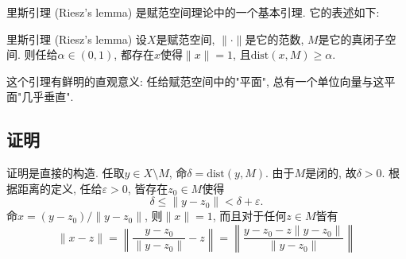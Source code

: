 
里斯引理 (Riesz's lemma) 是赋范空间理论中的一个基本引理. 它的表述如下:

\begin{lemma}{里斯引理 (Riesz's lemma)}
设$X$是赋范空间, $\|\cdot\|$是它的范数, $M$是它的真闭子空间. 则任给$\alpha\in(0,1)$, 都存在$x$使得$\|x\|=1$, 且$\text{dist}(x,M)\geq\alpha$.
\end{lemma}

这个引理有鲜明的直观意义: 任给赋范空间中的"平面", 总有一个单位向量与这平面"几乎垂直".

\subsection{证明}
证明是直接的构造. 任取$y\in X\setminus M$, 命$\delta=\text{dist}(y,M)$. 由于$M$是闭的, 故$\delta>0$. 根据距离的定义, 任给$\varepsilon>0$, 皆存在$z_0\in M$使得
$$
\delta\leq \|y-z_0\|<\delta+\varepsilon.
$$
命$x=(y-z_0)/\|y-z_0\|$, 则$\|x\|=1$, 而且对于任何$z\in M$皆有
$$
\|x-z\|
=\left\|\frac{y-z_0}{\|y-z_0\|}-z\right\|
=\left\|\frac{y-z_0-z\|y-z_0\|}{\|y-z_0\|}\right\|
$$